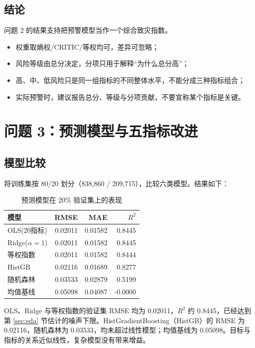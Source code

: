 \documentclass{article}
\begin{document}
\subsection{结论}
问题 2 的结果支持把预警模型当作一个综合致灾指数。
\begin{itemize}
  \item 权重取熵权/CRITIC/等权均可，差异可忽略；
  \item 风险等级由总分决定，分项只用于解释“为什么总分高”；
  \item 高、中、低风险只是同一组指标的不同整体水平，不能分成三种指标组合；
  \item 实际预警时，建议报告总分、等级与分项贡献，不要宣称某个指标是关键。
\end{itemize}

\section{问题 3：预测模型与五指标改进}

\subsection{模型比较}
将训练集按 80/20 划分（838,860 / 209,715），比较六类模型。结果如下：

\begin{table}[htbp]
\centering
\caption{预测模型在 20\% 验证集上的表现}
\label{tab:models}
\small
\begin{tabular}{lrrr}
\toprule
模型 & RMSE & MAE & $R^2$ \\
\midrule
OLS(20指标) & 0.02011 & 0.01582 & 0.8445 \\
Ridge($\alpha=1$) & 0.02011 & 0.01582 & 0.8445 \\
等权指数 & 0.02011 & 0.01582 & 0.8444 \\
HistGB & 0.02116 & 0.01689 & 0.8277 \\
随机森林 & 0.03533 & 0.02879 & 0.5199 \\
均值基线 & 0.05098 & 0.04087 & -0.0000 \\
\bottomrule
\end{tabular}
\end{table}


OLS、Ridge 与等权指数的验证集 RMSE 均为 0.02011，$R^2$ 约 0.8445，已经达到第 \ref{sec:eda} 节估计的噪声下限。HistGradientBoosting（HistGB）的 RMSE 为 0.02116，随机森林为 0.03533，均未超过线性模型；均值基线为 0.05098。目标与指标的关系近似线性，复杂模型没有带来增益。
\end{document}

